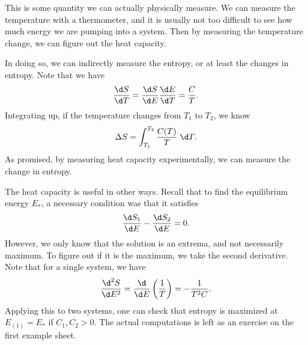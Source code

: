 \documentclass[a4paper]{article}
\begin{document}
This is some quantity we can actually physically measure. We can measure the temperature with a thermometer, and it is usually not too difficult to see how much energy we are pumping into a system. Then by measuring the temperature change, we can figure out the heat capacity.

In doing so, we can indirectly measure the entropy, or at least the changes in entropy. Note that we have
\[
  \frac{\d S}{\d T} = \frac{\d S}{\d E} \frac{\d E}{\d T} = \frac{C}{T}.
\]
Integrating up, if the temperature changes from $T_1$ to $T_2$, we know
\[
  \Delta S = \int_{T_1}^{T_2} \frac{C(T)}{T}\;\d T.
\]
As promised, by measuring heat capacity experimentally, we can measure the change in entropy.

The heat capacity is useful in other ways. Recall that to find the equilibrium energy $E_*$, a necessary condition was that it satisfies
\[
  \frac{\d S_1}{\d E} - \frac{\d S_2}{\d E} = 0.
\]
However, we only know that the solution is an extrema, and not necessarily maximum. To figure out if it is the maximum, we take the second derivative. Note that for a single system, we have
\[
  \frac{\d^2 S}{\d E^2} = \frac{\d}{\d E} \left(\frac{1}{T}\right) = -\frac{1}{T^2 C}.
\]
Applying this to two systems, one can check that entropy is maximized at $E_{(1)} = E_*$ if $C_1, C_2 > 0$. The actual computations is left as an exercise on the first example sheet.
\end{document}

